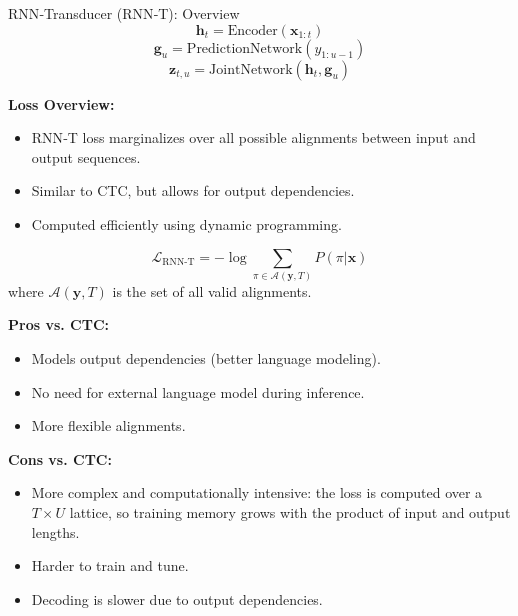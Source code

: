 \begin{frame}[t,allowframebreaks]{RNN‑Transducer (RNN‑T): Overview}
    \begin{equation}
        \mathbf{h}_t = \text{Encoder}(\mathbf{x}_{1:t})
    \end{equation}
    \begin{equation}
        \mathbf{g}_u = \text{PredictionNetwork}(y_{1:u-1})
    \end{equation}
    \begin{equation}
        \mathbf{z}_{t,u} = \text{JointNetwork}(\mathbf{h}_t, \mathbf{g}_u)
    \end{equation}

    \framebreak

    \textbf{Loss Overview:}
    \begin{itemize}
        \item RNN‑T loss marginalizes over all possible alignments between input and output sequences.
        \item Similar to CTC, but allows for output dependencies.
        \item Computed efficiently using dynamic programming.
    \end{itemize}

    \begin{equation}
        \mathcal{L}_{\text{RNN-T}} = -\log \sum_{\pi \in \mathcal{A}(\mathbf{y}, T)} P(\pi | \mathbf{x})
    \end{equation}
    where $\mathcal{A}(\mathbf{y}, T)$ is the set of all valid alignments.

    \framebreak

    \textbf{Pros vs. CTC:}
    \begin{itemize}
        \item Models output dependencies (better language modeling).
        \item No need for external language model during inference.
        \item More flexible alignments.
    \end{itemize}

    \textbf{Cons vs. CTC:}
    \begin{itemize}
        \item More complex and computationally intensive: the loss is computed over a $T \times U$ lattice, so training memory grows with the product of input and output lengths.
        \item Harder to train and tune.
        \item Decoding is slower due to output dependencies.
    \end{itemize}
\end{frame}